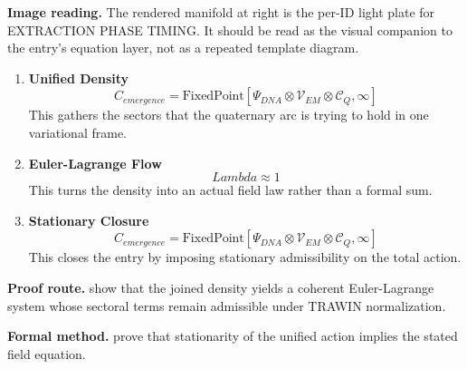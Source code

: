 \begin{samepage}
\noindent\begin{minipage}[t]{0.45\linewidth}
\vspace{0pt}
\raggedright
\scriptsize\textbf{Image reading.} The rendered manifold at right is the per-ID light plate for EXTRACTION PHASE TIMING. It should be read as the visual companion to the entry's equation layer, not as a repeated template diagram.\par
\end{minipage}\hfill
\begin{minipage}[t]{0.53\linewidth}
\vspace*{-0.10in}
\raggedright
{}
\end{minipage}
\end{samepage}

\clearpage


\begin{enumerate}[leftmargin=1.6em,itemsep=9pt,topsep=6pt]
\item \textbf{Unified Density}
\[
C_{emergence} = \text{FixedPoint}[\Psi_{DNA} \otimes \mathcal{V}_{EM} \otimes \mathcal{C}_{Q}, \infty]
\]
This gathers the sectors that the quaternary arc is trying to hold in one variational frame.

\item \textbf{Euler-Lagrange Flow}
\[
Lambda \approx 1
\]
This turns the density into an actual field law rather than a formal sum.

\item \textbf{Stationary Closure}
\[
C_{emergence} = \text{FixedPoint}[\Psi_{DNA} \otimes \mathcal{V}_{EM} \otimes \mathcal{C}_{Q}, \infty]
\]
This closes the entry by imposing stationary admissibility on the total action.
\end{enumerate}

\textbf{Proof route.} show that the joined density yields a coherent Euler-Lagrange system whose sectoral terms remain admissible under TRAWIN normalization.

\textbf{Formal method.} prove that stationarity of the unified action implies the stated field equation.

\medskip
{}

